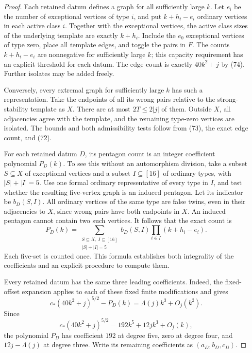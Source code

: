 \begin{proof}
Each retained datum defines a graph for all sufficiently large $k$. Let
$e_i$ be the number of exceptional vertices of type $i$, and put
$k+h_i-e_i$ ordinary vertices in each active class $i$. Together with
the exceptional vertices, the active class sizes of the underlying
template are exactly $k+h_i$. Include the $e_0$ exceptional vertices of
type zero, place all template edges, and toggle the pairs in $F$. The
counts $k+h_i-e_i$ are nonnegative for sufficiently large $k$; this
capacity requirement has an explicit threshold for each datum. The
edge count is exactly $40k^2+j$ by (74). Further isolates may be added
freely.

Conversely, every extremal graph for sufficiently large $k$ has such a
representation. Take the endpoints of all its wrong pairs relative to
the strong-stability template as $X$. There are at most $2T\leq2|j|$ of
them. Outside $X$, all adjacencies agree with the template, and the
remaining type-zero vertices are isolated. The bounds and both
admissibility tests follow from (73), the exact edge count, and (72).

For each retained datum $D$, its pentagon count is an integer
coefficient polynomial $P_D(k)$. To see this without an automorphism
division, take a subset $S\subseteq X$ of exceptional vertices and a
subset $I\subseteq[16]$ of ordinary types, with $|S|+|I|=5$. Use one
formal ordinary representative of every type in $I$, and test whether
the resulting five-vertex graph is an induced pentagon. Let its
indicator be $b_D(S,I)$. All ordinary vertices of the same type are
false twins, even in their adjacencies to $X$, since wrong pairs have
both endpoints in $X$. An induced pentagon cannot contain two such
vertices. It follows that the exact count is
\begin{equation}\tag{75}\label{eq:exact-construction-polynomial}
 P_D(k)=\sum_{\substack{S\subseteq X,\ I\subseteq[16]\\|S|+|I|=5}}
              b_D(S,I)\prod_{i\in I}(k+h_i-e_i).
\end{equation}
Each five-set is counted once. This formula establishes both
integrality of the coefficients and an explicit procedure to compute
them.

Every retained datum has the same three leading coefficients. Indeed,
the fixed-offset expansion applies to each of these fixed finite
modifications and gives
\[
 c_\ast(40k^2+j)^{5/2}-P_D(k)=\Lambda(j)k^3+O_j(k^2).
\]
Since
\[
 c_\ast(40k^2+j)^{5/2}=192k^5+12jk^3+O_j(k),
\]
the polynomial $P_D$ has coefficient $192$ at degree five, zero at
degree four, and $12j-\Lambda(j)$ at degree three. Write its remaining
coefficients as $(a_D,b_D,c_D)$.


\end{proof}
